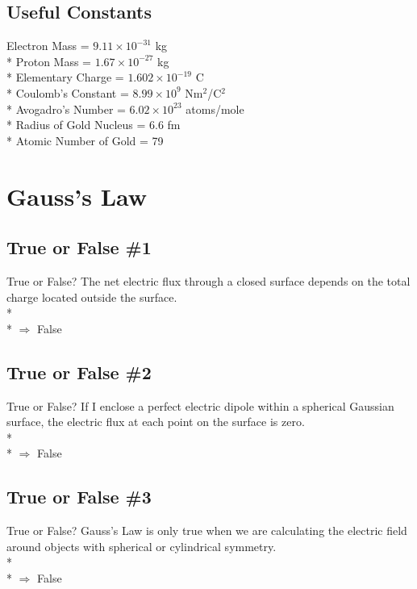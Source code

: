 \documentclass[11pt]{article}
\begin{document}
\maketitle
\tableofcontents
\vspace{50pt}

\subsection*{Useful Constants}
Electron Mass = $9.11 \times 10^{-31}$ kg \\*
Proton Mass = $1.67 \times 10^{-27}$ kg \\*
Elementary Charge = $1.602 \times 10^{-19}$ C \\*
Coulomb's Constant = $8.99 \times 10^9$ Nm$^2$/C$^2$ \\*
Avogadro's Number = $ 6.02 \times 10^{23}$ atoms/mole \\*
Radius of Gold Nucleus = 6.6 fm \\*
Atomic Number of Gold = 79


\pagebreak
\section{Gauss's Law}
\vspace{10pt}

\subsection{True or False \#1}
True or False?  The net electric flux through a closed surface depends on the total charge located outside the surface.\\* \\*
$\Rightarrow$ False

\subsection{True or False \#2}
True or False?  If I enclose a perfect electric dipole within a spherical Gaussian surface, the electric flux at each point on the surface is zero.\\* \\*
$\Rightarrow$ False

\subsection{True or False \#3}
True or False?  Gauss's Law is only true when we are calculating the electric field around objects with spherical or cylindrical symmetry.\\* \\*
$\Rightarrow$ False
\end{document}
